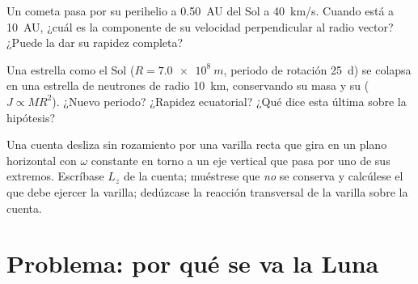 \begin{exercise}[$\star\star\star$]\label{exo:b1:angular-momentum:10}
Un cometa pasa por su perihelio a \qty{0.50}{AU} del Sol a \qty{40}{km/s}.
Cuando está a \qty{10}{AU}, ¿cuál es la componente de su velocidad
perpendicular al radio vector? ¿Puede la  dar su rapidez
completa?
\end{exercise}

\begin{exercise}[$\star\star\star$]\label{exo:b1:angular-momentum:11}
Una estrella como el Sol ($R = \qty{7.0e8}{m}$, periodo de rotación
\qty{25}{d}) se colapsa en una estrella de neutrones de radio \qty{10}{km},
conservando su masa y su  ($J \propto MR^2$). ¿Nuevo
periodo? ¿Rapidez ecuatorial? ¿Qué dice esta última sobre la hipótesis?
\end{exercise}

\begin{exercise}[$\star\star\star$]\label{exo:b1:angular-momentum:12}
Una cuenta desliza sin rozamiento por una varilla recta que gira en un
plano horizontal con $\omega$ constante en torno a un eje vertical que pasa
por uno de sus extremos. Escríbase $L_z$ de la cuenta; muéstrese que
\emph{no} se conserva y calcúlese el  que debe ejercer la varilla;
dedúzcase la reacción transversal de la varilla sobre la cuenta.
\end{exercise}

\section{Problema: por qué se va la Luna}

